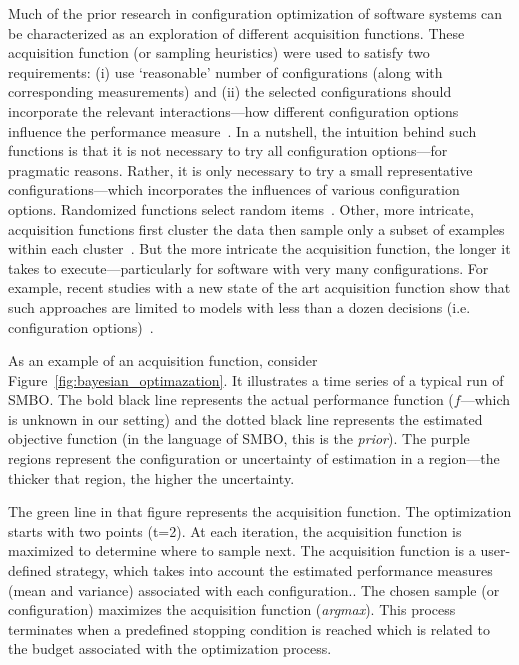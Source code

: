 Much of the prior  research in configuration optimization of software systems can
be characterized as an exploration of 
different acquisition functions.
These acquisition function (or sampling heuristics) were used to satisfy two requirements: (i) use `reasonable' number of configurations (along with corresponding measurements) and (ii) the selected configurations should incorporate the relevant interactions---how different configuration options influence the performance measure~\cite{Siegmund2015}.
In a nutshell, the intuition behind such functions is that it is not necessary to try all configuration options---for pragmatic reasons. Rather, it is only necessary to try a small representative configurations---which incorporates the influences of various configuration options.
Randomized  functions
 select random items~\cite{guo2013variability, sarkar2015cost}. Other, more intricate,
acquisition functions first cluster the data then sample only
a subset of examples within each cluster~\cite{nair17}.
But the more intricate the acquisition function, the longer it
takes to execute---particularly for software with very many configurations.  For example,
recent studies with   a new state of the art acquisition function show that such approaches are limited to models with less than a dozen decisions (i.e. configuration options)~\cite{zuluaga2016varepsilon}.




As an example of an acquisition function, consider
Figure~\ref{fig:bayesian_optimazation}. It illustrates a time series of a typical
 run of SMBO. The bold black line represents the actual performance function ($f$---which is unknown in our setting) and the dotted black line represents the estimated objective function (in the language of SMBO, this is the {\em prior}). 
 The purple regions represent the configuration or uncertainty of estimation in a region---the thicker that region, the higher the uncertainty.
 
 The green line in that figure represents the acquisition function. The optimization starts with two points (t=2). At each iteration, the acquisition function is maximized to determine where to sample next. The acquisition function is a user-defined strategy, which takes into account the estimated performance measures (mean and variance) associated with each configuration.. The chosen sample (or configuration) maximizes the acquisition function (\textit{argmax}). This process terminates when a predefined stopping condition is reached which is related to the budget associated with the optimization process.

